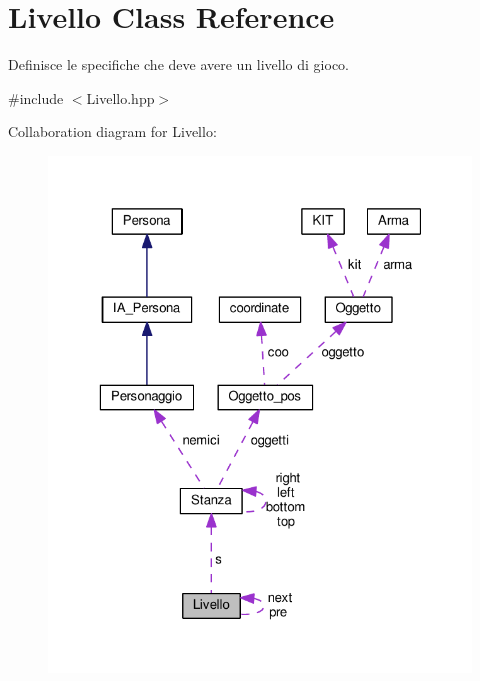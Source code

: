 \hypertarget{classLivello}{}\section{Livello Class Reference}
\label{classLivello}


Definisce le specifiche che deve avere un livello di gioco.  




{\ttfamily \#include $<$Livello.\+hpp$>$}



Collaboration diagram for Livello\+:\nopagebreak
\begin{figure}[H]
\begin{center}
\leavevmode
\includegraphics[width=323pt]{classLivello__coll__graph}
\end{center}
\end{figure}
